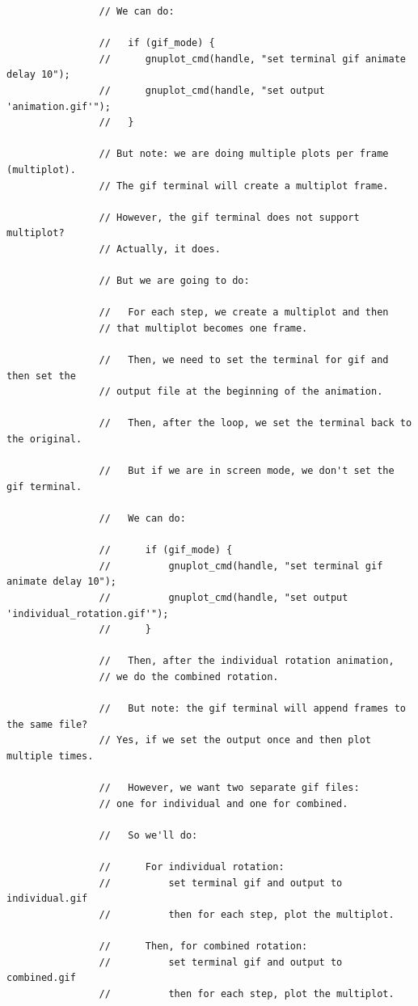 \documentclass[a4paper,10pt]{article}
\begin{document}
\begin{verbatim}
                // We can do:

                //   if (gif_mode) {
                //      gnuplot_cmd(handle, "set terminal gif animate delay 10");
                //      gnuplot_cmd(handle, "set output 'animation.gif'");
                //   }

                // But note: we are doing multiple plots per frame (multiplot).
                // The gif terminal will create a multiplot frame.

                // However, the gif terminal does not support multiplot?
                // Actually, it does.

                // But we are going to do:

                //   For each step, we create a multiplot and then
                // that multiplot becomes one frame.

                //   Then, we need to set the terminal for gif and then set the
                // output file at the beginning of the animation.

                //   Then, after the loop, we set the terminal back to the original.

                //   But if we are in screen mode, we don't set the gif terminal.

                //   We can do:

                //      if (gif_mode) {
                //          gnuplot_cmd(handle, "set terminal gif animate delay 10");
                //          gnuplot_cmd(handle, "set output 'individual_rotation.gif'");
                //      }

                //   Then, after the individual rotation animation,
                // we do the combined rotation.

                //   But note: the gif terminal will append frames to the same file?
                // Yes, if we set the output once and then plot multiple times.

                //   However, we want two separate gif files:
                // one for individual and one for combined.

                //   So we'll do:

                //      For individual rotation:
                //          set terminal gif and output to individual.gif
                //          then for each step, plot the multiplot.

                //      Then, for combined rotation:
                //          set terminal gif and output to combined.gif
                //          then for each step, plot the multiplot.


\end{verbatim}
\end{document}
